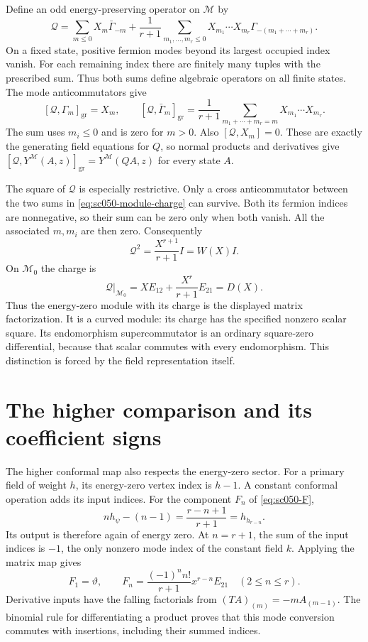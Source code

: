 Define an odd energy-preserving operator on \(\mathcal M\) by
\begin{equation}\label{eq:sc050-module-charge}
 \mathcal Q=
   \sum_{m\le0}X_m\bar\Gamma_{-m}
   +\frac1{r+1}
      \sum_{m_1,\ldots,m_r\le0}
          X_{m_1}\cdots X_{m_r}\Gamma_{-(m_1+\cdots+m_r)}.
\end{equation}
On a fixed state, positive fermion modes beyond its largest
occupied index vanish. For each remaining index there are
finitely many tuples with the prescribed sum. Thus both sums
define algebraic operators on all finite states.
The mode anticommutators give
\[
 [\mathcal Q,\Gamma_m]_{\mathrm{gr}}=X_m,\qquad
 [\mathcal Q,\bar\Gamma_m]_{\mathrm{gr}}
   =\frac1{r+1}\sum_{m_1+\cdots+m_r=m}
                         X_{m_1}\cdots X_{m_r}.
\]
The sum uses \(m_i\le0\) and is zero for \(m>0\).
Also \([\mathcal Q,X_m]=0\). These are exactly the generating
field equations for \(Q\), so normal products and derivatives
give \([\mathcal Q,Y^{\mathcal M}(A,z)]_{\mathrm{gr}}
=Y^{\mathcal M}(QA,z)\) for every state \(A\).

The square of \(\mathcal Q\) is especially restrictive.
Only a cross anticommutator between the two sums in
\eqref{eq:sc050-module-charge} can survive. Both its fermion
indices are nonnegative, so their sum can be zero only when
both vanish. All the associated \(m,m_i\) are then zero.
Consequently
\begin{equation}\label{eq:sc050-module-curvature}
 \mathcal Q^2=\frac{X^{r+1}}{r+1}I=W(X)I.
\end{equation}
On \(\mathcal M_0\) the charge is
\[
 \mathcal Q|_{\mathcal M_0}
       =X E_{12}+\frac{X^r}{r+1}E_{21}=D(X).
\]
Thus the energy-zero module with its charge is the displayed
matrix factorization. It is a curved module: its charge has
the specified nonzero scalar square. Its endomorphism
supercommutator is an ordinary square-zero differential,
because that scalar commutes with every endomorphism.
This distinction is forced by the field representation itself.

\section{The higher comparison and its coefficient signs}
\label{sec:sc050-associative}

The higher conformal map also respects the energy-zero sector.
For a primary field of weight \(h\), its energy-zero vertex index
is \(h-1\). A constant conformal operation adds its input indices.
For the component \(F_n\) of \eqref{eq:sc050-F},
\[
 n h_\psi-(n-1)=\frac{r-n+1}{r+1}=h_{h_{r-n}}.
\]
Its output is therefore again of energy zero. At \(n=r+1\),
the sum of the input indices is \(-1\), the only nonzero mode
index of the constant field \(k\). Applying the matrix map gives
\begin{equation}\label{eq:sc050-matrix-F}
 F_1=\vartheta,\qquad
 F_n=\frac{(-1)^nn!}{r+1}x^{r-n}E_{21}\quad(2\le n\le r).
\end{equation}
Derivative inputs have the falling factorials from
\((TA)_{(m)}=-mA_{(m-1)}\). The binomial rule for differentiating
a product proves that this mode conversion commutes with
insertions, including their summed indices.

